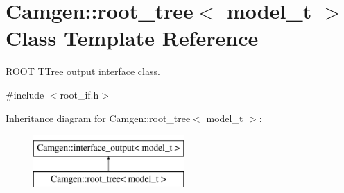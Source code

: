 \hypertarget{a00481}{}\section{Camgen\+:\+:root\+\_\+tree$<$ model\+\_\+t $>$ Class Template Reference}
\label{a00481}


R\+O\+O\+T T\+Tree output interface class.  




{\ttfamily \#include $<$root\+\_\+if.\+h$>$}

Inheritance diagram for Camgen\+:\+:root\+\_\+tree$<$ model\+\_\+t $>$\+:\begin{figure}[H]
\begin{center}
\leavevmode
\includegraphics[height=2.000000cm]{a00481}
\end{center}
\end{figure}
